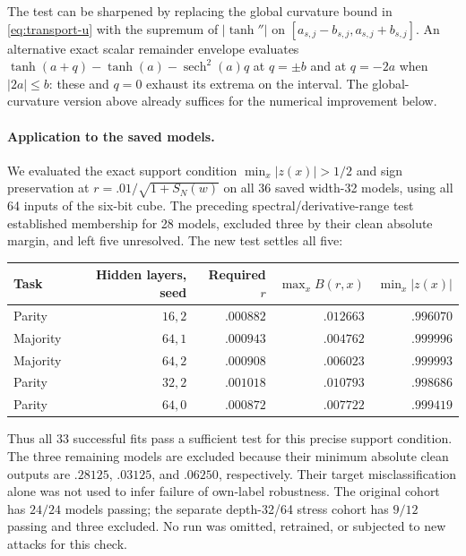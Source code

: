 The test can be sharpened by replacing the global curvature bound in
\eqref{eq:transport-u} with the supremum of $|\tanh''|$ on
$[a_{s,j}-b_{s,j},a_{s,j}+b_{s,j}]$. An alternative exact scalar remainder
envelope evaluates
$\tanh(a+q)-\tanh(a)-\operatorname{sech}^2(a)q$
at $q=\pm b$ and at $q=-2a$ when $|2a|\le b$: these and $q=0$ exhaust
its extrema on the interval. The global-curvature version above already
suffices for the numerical improvement below.

\paragraph{Application to the saved models.}
We evaluated the exact support condition
$\min_x|z(x)|>1/2$ and sign preservation at
$r=.01/\sqrt{1+S_N(w)}$ on all 36 saved width-32 models, using all 64
inputs of the six-bit cube. The preceding spectral/derivative-range test established
membership for 28 models, excluded three by their clean absolute margin,
and left five unresolved. The new test settles all five:
\begin{center}
\begin{tabular}{lrrrr}
\toprule
Task & Hidden layers, seed & Required $r$ & $\max_x B(r,x)$ & $\min_x|z(x)|$\\
\midrule
Parity & $16,2$ & $.000882$ & $.012663$ & $.996070$\\
Majority & $64,1$ & $.000943$ & $.004762$ & $.999996$\\
Majority & $64,2$ & $.000908$ & $.006023$ & $.999993$\\
Parity & $32,2$ & $.001018$ & $.010793$ & $.998686$\\
Parity & $64,0$ & $.000872$ & $.007722$ & $.999419$\\
\bottomrule
\end{tabular}
\end{center}
Thus all 33 successful fits pass a sufficient test for this precise support
condition. The three remaining models are excluded because their minimum
absolute clean outputs are $.28125$, $.03125$, and $.06250$, respectively.
Their target misclassification alone was not used to infer failure of
own-label robustness. The original cohort has $24/24$ models passing; the
separate depth-32/64 stress cohort has $9/12$ passing and three excluded.
No run was omitted, retrained, or subjected to new attacks for this check.

